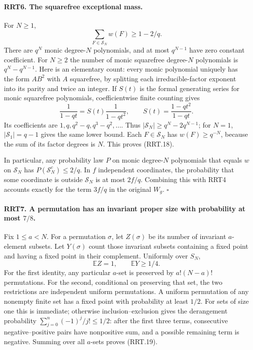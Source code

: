\paragraph{RRT6. The squarefree exceptional mass.}
\label{claim:RRT6}
For $N\ge1$,
\[
                  \sum_{F\in\mathcal S_N}w(F)\ge1-2/q.
 \tag{RRT.18}
\]
There are $q^N$ monic degree-$N$ polynomials, and at most
$q^{N-1}$ have zero constant coefficient.  For $N\ge2$ the
number of monic squarefree degree-$N$ polynomials is
$q^N-q^{N-1}$.  Here is an elementary count: every monic
polynomial uniquely has the form $AB^2$ with $A$ squarefree,
by splitting each irreducible-factor exponent into its parity
and twice an integer.  If $S(t)$ is the formal generating series
for monic squarefree polynomials, coefficientwise finite
counting gives
\[
 \frac1{1-qt}=S(t)\frac1{1-qt^2},\qquad
                  S(t)=\frac{1-qt^2}{1-qt}.
\]
Its coefficients are $1,q,q^2-q,q^3-q^2,\ldots$.
Thus $|\mathcal S_N|\ge q^N-2q^{N-1}$; for $N=1$,
$|\mathcal S_1|=q-1$ gives the same lower bound.
Each $F\in\mathcal S_N$ has $w(F)\ge q^{-N}$, because the
sum of its factor degrees is $N$.  This proves (RRT.18).

In particular, any probability law $P$ on monic degree-$N$
polynomials that equals $w$ on $\mathcal S_N$ has
$P(\mathcal S_N^c)\le2/q$.  In $f$ independent coordinates,
the probability that some coordinate is outside $\mathcal S_N$
is at most $2f/q$.  Combining this with RRT4 accounts exactly
for the term $3f/q$ in the original $W_g$.
\hfill$\square$

\paragraph{RRT7. A permutation has an invariant proper size with probability at most $7/8$.}
\label{claim:RRT7}
Fix $1\le a<N$.  For a permutation $\sigma$, let $Z(\sigma)$
be its number of invariant $a$-element subsets.  Let
$Y(\sigma)$ count those invariant subsets containing a fixed
point and having a fixed point in their complement.  Uniformly
over $S_N$,
\[
                \mathbb EZ=1,\qquad \mathbb EY\ge1/4.
 \tag{RRT.19}
\]
For the first identity, any particular $a$-set is preserved by
$a!(N-a)!$ permutations.  For the second, conditional on
preserving that set, the two restrictions are independent uniform
permutations.  A uniform permutation of any nonempty finite set
has a fixed point with probability at least $1/2$.  For sets of
size one this is immediate; otherwise inclusion--exclusion gives
the derangement probability $\sum_{j=0}^n(-1)^j/j!\le1/2$:
after the first three terms, consecutive negative--positive
pairs have nonpositive sum, and a possible remaining term is
negative.  Summing over all $a$-sets proves (RRT.19).


